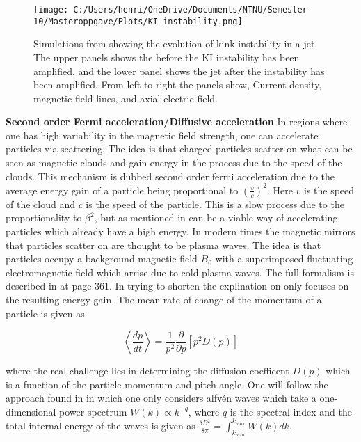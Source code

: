 \begin{figure}
    \centering
    \texttt{[image: C:/Users/henri/OneDrive/Documents/NTNU/Semester 10/Masteroppgave/Plots/KI\_instability.png]}
    \caption{Simulations from \cite{Alves_2018} showing the evolution of kink instability in a jet. The upper panels shows the before the KI instability has been amplified, and the lower panel shows the jet after the instability has been amplified. From left to right the panels show, Current density, magnetic field lines, and axial electric field. }
    \label{fig:kink_instability}
\end{figure}



\textbf{Second order Fermi acceleration/Diffusive acceleration}
In regions where one has high variability in the magnetic field strength, one can accelerate particles via scattering. The idea is that charged particles scatter on what can be seen as magnetic clouds and gain energy in the process due to the speed of the clouds. This mechanism is dubbed second order fermi acceleration due to the average energy gain of a particle being proportional to $(\frac{v}{c})^2$. Here $v$ is the speed of the cloud and $c$ is the speed of the particle. This is a slow process due to the proportionality to $\beta^2$, but as mentioned in \cite{Dermer_2001} can be a viable way of accelerating particles which already have a high energy. In modern times the magnetic mirrors that particles scatter on are thought to be plasma waves. The idea is that particles occupy a background magnetic field $B_0$ with a superimposed fluctuating electromagnetic field which arrise due to cold-plasma waves. The full formalism is described in \cite{BHradiation} at page 361. In trying to shorten the explination on only focuses on the resulting energy gain. The mean rate of change of the momentum of a particle is given as

\begin{equation}
    \left<\frac{dp}{dt}\right> = \frac{1}{p^2}\frac{\partial}{\partial p}\left[p^2D(p)\right] 
\end{equation}

where the real challenge lies in determining the diffusion coefficent $D(p)$ which is a function of the particle momentum and pitch angle. One will follow the approach found in \cite{O_Sullivan_2009} in which one only considers alfvén waves which take a one-dimensional power spectrum $W(k) \propto k^{-q}$, where $q$ is the spectral index and the total internal energy of the waves is given as $\frac{\delta B^2 }{8\pi}= \int_{k_{min}}^{k_{max}} W(k)dk$.   

